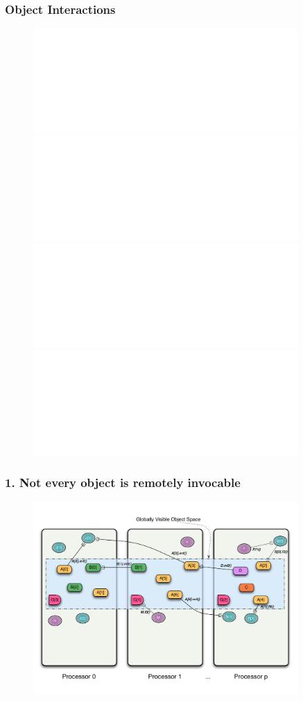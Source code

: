\begin{frame}
  \frametitle{Object Interactions }
  \begin{figure}
	\includegraphics<1>[width=0.9\textwidth]{../figures/progmodel/07-obj-programmer-view.pdf}
	\includegraphics<2>[width=0.9\textwidth]{../figures/progmodel/05-parallelism-via-obj-collections.pdf}
	\includegraphics<3>[width=0.9\textwidth]{../figures/progmodel/08-seq-obj-methods.pdf}
	\includegraphics<4>[width=0.9\textwidth]{../figures/progmodel/09-rmi-synchronous.pdf}
  \end{figure}
\end{frame}


\begin{frame}
\frametitle{1. Not every object is remotely invocable}
  \begin{figure}\includegraphics[width=0.9\textwidth]{../figures/progmodel/10-rmi-notgas.pdf}\end{figure}
\end{frame}


